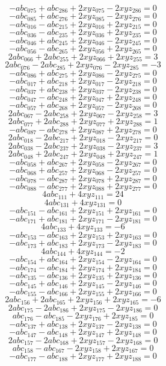 \[ - abc_{075} + abc_{286} + 2 xyz_{075} - 2 xyz_{286} = 0 \]
\[ - abc_{085} + abc_{276} + 2 xyz_{085} - 2 xyz_{276} = 0 \]
\[ - abc_{016} - abc_{215} + 2 xyz_{016} + 2 xyz_{215} = 0 \]
\[ - abc_{036} - abc_{235} + 2 xyz_{036} + 2 xyz_{235} = 0 \]
\[ - abc_{046} + abc_{245} + 2 xyz_{046} - 2 xyz_{245} = 0 \]
\[ - abc_{056} - abc_{265} + 2 xyz_{056} + 2 xyz_{265} = 0 \]
\[ 2 abc_{066} + 2 abc_{255} + 2 xyz_{066} + 2 xyz_{255} = 3 \]
\[ 2 abc_{076} - 2 abc_{285} + 2 xyz_{076} - 2 xyz_{285} = -3 \]
\[ - abc_{086} + abc_{275} + 2 xyz_{086} - 2 xyz_{275} = 0 \]
\[ - abc_{017} + abc_{218} + 2 xyz_{017} - 2 xyz_{218} = 0 \]
\[ - abc_{037} + abc_{238} + 2 xyz_{037} - 2 xyz_{238} = 0 \]
\[ - abc_{047} - abc_{248} + 2 xyz_{047} + 2 xyz_{248} = 0 \]
\[ - abc_{057} + abc_{268} + 2 xyz_{057} - 2 xyz_{268} = 0 \]
\[ 2 abc_{067} - 2 abc_{258} + 2 xyz_{067} - 2 xyz_{258} = 3 \]
\[ 2 abc_{077} + 2 abc_{288} + 2 xyz_{077} + 2 xyz_{288} = 1 \]
\[ - abc_{087} - abc_{278} + 2 xyz_{087} + 2 xyz_{278} = 0 \]
\[ 2 abc_{018} - 2 abc_{217} + 2 xyz_{018} - 2 xyz_{217} = 0 \]
\[ 2 abc_{038} - 2 abc_{237} + 2 xyz_{038} - 2 xyz_{237} = 3 \]
\[ 2 abc_{048} + 2 abc_{247} + 2 xyz_{048} + 2 xyz_{247} = 1 \]
\[ - abc_{058} + abc_{267} + 2 xyz_{058} - 2 xyz_{267} = 0 \]
\[ - abc_{068} + abc_{257} + 2 xyz_{068} - 2 xyz_{257} = 0 \]
\[ - abc_{078} - abc_{287} + 2 xyz_{078} + 2 xyz_{287} = 0 \]
\[ - abc_{088} - abc_{277} + 2 xyz_{088} + 2 xyz_{277} = 0 \]
\[ 4 abc_{111} + 4 xyz_{111} = 24 \]
\[ 4 abc_{131} + 4 xyz_{131} = 0 \]
\[ - abc_{151} - abc_{161} + 2 xyz_{151} + 2 xyz_{161} = 0 \]
\[ - abc_{171} + abc_{181} + 2 xyz_{171} - 2 xyz_{181} = 0 \]
\[ 4 abc_{133} + 4 xyz_{133} = -6 \]
\[ - abc_{153} - abc_{163} + 2 xyz_{153} + 2 xyz_{163} = 0 \]
\[ - abc_{173} + abc_{183} + 2 xyz_{173} - 2 xyz_{183} = 0 \]
\[ 4 abc_{144} + 4 xyz_{144} = -2 \]
\[ - abc_{154} + abc_{164} + 2 xyz_{154} - 2 xyz_{164} = 0 \]
\[ - abc_{174} - abc_{184} + 2 xyz_{174} + 2 xyz_{184} = 0 \]
\[ - abc_{135} - abc_{136} + 2 xyz_{135} + 2 xyz_{136} = 0 \]
\[ - abc_{145} + abc_{146} + 2 xyz_{145} - 2 xyz_{146} = 0 \]
\[ - abc_{155} - abc_{166} + 2 xyz_{155} + 2 xyz_{166} = 0 \]
\[ 2 abc_{156} + 2 abc_{165} + 2 xyz_{156} + 2 xyz_{165} = -6 \]
\[ 2 abc_{175} - 2 abc_{186} + 2 xyz_{175} - 2 xyz_{186} = 0 \]
\[ abc_{176} - abc_{185} - 2 xyz_{176} + 2 xyz_{185} = 0 \]
\[ - abc_{137} + abc_{138} + 2 xyz_{137} - 2 xyz_{138} = 0 \]
\[ - abc_{147} - abc_{148} + 2 xyz_{147} + 2 xyz_{148} = 0 \]
\[ 2 abc_{157} - 2 abc_{168} + 2 xyz_{157} - 2 xyz_{168} = 0 \]
\[ abc_{158} - abc_{167} - 2 xyz_{158} + 2 xyz_{167} = 0 \]
\[ - abc_{177} - abc_{188} + 2 xyz_{177} + 2 xyz_{188} = 0 \]
